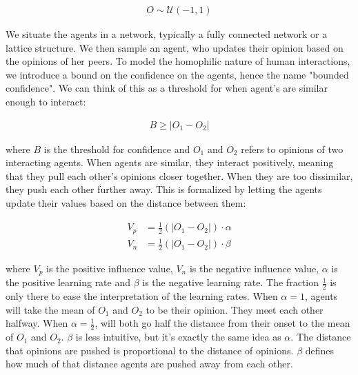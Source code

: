 \documentclass[9pt,twocolumn,twoside]{ilcss}
\begin{document}
\begin{figure}[h]
	\begin{align*}
	O \sim \mathcal{U}(-1, 1)
	\end{align*}
\end{figure}

We situate the agents in a network, typically a fully connected network or a lattice structure. 
We then sample an agent, who updates their opinion based on the opinions of her peers. 
To model the homophilic nature of human interactions, we introduce a bound on the confidence on the agents, hence the name "bounded confidence". 
We can think of this as a threshold for when agent's are similar enough to interact:

\begin{figure}[h]
	\begin{align*}
	B \geq |O_1 - O_2|
	\end{align*}
\end{figure}

where $B$ is the threshold for confidence and $O_1$ and $O_2$ refers to opinions of two interacting agents.
When agents are similar, they interact positively, meaning that they pull each other's opinions closer together. 
When they are too dissimilar, they push each other further away.
This is formalized by letting the agents update their values based on the distance between them:

\begin{figure}[h]
	\begin{align*}
	V_p &= \frac{1}{2} (|O_1 - O_2|) \cdot \alpha \\
	V_n &=  \frac{1}{2} (|O_1 - O_2|) \cdot \beta
	\end{align*}
\end{figure}

where $V_p$ is the positive influence value, $V_n$ is the negative influence value,
$\alpha$ is the positive learning rate and $\beta$ is the negative learning rate. 
The fraction $\frac{1}{2}$ is only there to ease the interpretation of the learning rates.
When $\alpha = 1$, agents will take the mean of $O_1$ and $O_2$ to be their opinion. They meet each other halfway.
When $\alpha = \frac{1}{2}$, will both go half the distance from their onset to the mean of $O_1$ and $O_2$. 
$\beta$ is less intuitive, but it's exactly the same idea as $\alpha$. The distance that opinions are pushed is proportional to the distance of opinions.
$\beta$ defines how much of that distance agents are pushed away from each other.
\end{document}
